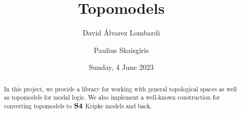 \documentclass[12pt,a4paper]{article}
\title{Topomodels}
\author{David Álvarez Lombardi \and Paulius Skaisgiris}
\date{Sunday, 4 June 2023}
\begin{document}
\maketitle

\begin{abstract}
In this project, we provide a library for working with general topological spaces as well as topomodels for modal logic.
We also implement a well-known construction for converting topomodels to $\mathbf{S4}$ Kripke models and back.
\end{abstract}

\tableofcontents

\clearpage




























\end{document}
